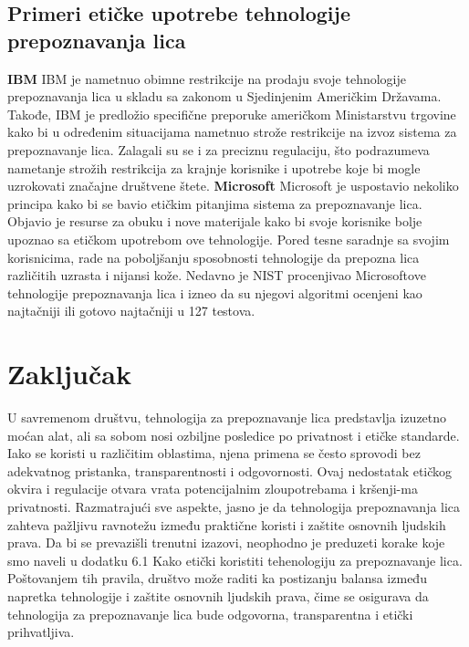 \documentclass{article}
\begin{document}
\subsection{Primeri etičke upotrebe tehnologije prepoznavanja lica}
\textbf{IBM}
\newline
\newline
IBM je nametnuo obimne restrikcije na prodaju svoje tehnologije prepoznavanja lica u skladu sa zakonom u Sjedinjenim Američkim Državama. Takođe, IBM je predložio specifične preporuke američkom Ministarstvu trgovine kako bi u određenim situacijama nametnuo strože restrikcije na izvoz sistema za prepoznavanje lica. 
\newline
\newline
Zalagali su se i za preciznu regulaciju, što podrazumeva nametanje strožih restrikcija za krajnje korisnike i upotrebe koje bi mogle uzrokovati značajne društvene štete.
\newline
\newline
\textbf{Microsoft}
\newline
\newline
Microsoft je uspostavio nekoliko principa kako bi se bavio etičkim pitanjima sistema za prepoznavanje lica. Objavio je resurse za obuku i nove materijale kako bi svoje korisnike bolje upoznao sa etičkom upotrebom ove tehnologije.
\newline
\newline
Pored tesne saradnje sa svojim korisnicima, rade na poboljšanju sposobnosti tehnologije da prepozna lica različitih uzrasta i nijansi kože. Nedavno je NIST procenjivao Microsoftove tehnologije prepoznavanja lica i izneo da su njegovi algoritmi ocenjeni kao najtačniji ili gotovo najtačniji u 127 testova. 

\newpage
\section{Zaključak}
U savremenom društvu, tehnologija za prepoznavanje lica predstavlja izuzetno moćan alat, ali sa sobom nosi ozbiljne posledice po privatnost i etičke standarde. Iako se koristi u različitim oblastima, njena primena se često sprovodi bez adekvatnog pristanka, transparentnosti i odgovornosti. Ovaj nedostatak etičkog okvira i regulacije otvara vrata potencijalnim zloupotrebama i kršenji-ma privatnosti.
\newline
\newline
Razmatrajući sve aspekte, jasno je da tehnologija prepoznavanja lica zahteva pažljivu ravnotežu između praktične koristi i zaštite osnovnih ljudskih prava. Da bi se prevazišli trenutni izazovi, neophodno je preduzeti korake koje smo naveli u dodatku 6.1 Kako etički koristiti tehenologiju za prepoznavanje lica.
\newline
\newline
Poštovanjem tih pravila, društvo može raditi ka postizanju balansa između napretka tehnologije i zaštite osnovnih ljudskih prava, čime se osigurava da tehnologija za prepoznavanje lica bude odgovorna, transparentna i etički prihvatljiva.
\newpage
\end{document}
